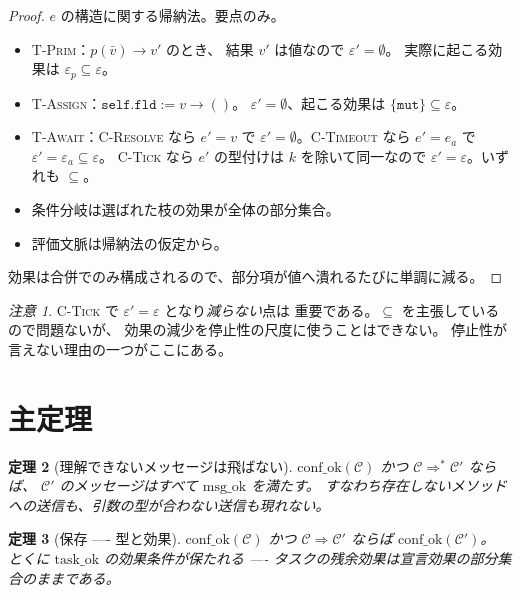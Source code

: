 \documentclass[11pt,a4paper]{ltjsarticle}
\newtheorem{theorem}{定理}
\theoremstyle{definition}
\theoremstyle{remark}
\newtheorem{remark}[theorem]{注意}
\newcommand{\msgok}{\mathrm{msg\_ok}}
\newcommand{\taskok}{\mathrm{task\_ok}}
\newcommand{\confok}{\mathrm{conf\_ok}}
\newcommand{\cstep}{\Longrightarrow}
\begin{document}
\begin{proof}
$e$ の構造に関する帰納法。要点のみ。
\begin{itemize}
\item \textsc{T-Prim}：$p(\bar v) \to v'$ のとき、
  結果 $v'$ は値なので $\varepsilon' = \emptyset$。
  実際に起こる効果は $\varepsilon_p \subseteq \varepsilon$。
\item \textsc{T-Assign}：$\mathtt{self}.\mathtt{fld} := v \to ()$。
  $\varepsilon' = \emptyset$、起こる効果は $\{\mathtt{mut}\} \subseteq \varepsilon$。
\item \textsc{T-Await}：\textsc{C-Resolve} なら $e' = v$ で
  $\varepsilon' = \emptyset$。\textsc{C-Timeout} なら $e' = e_a$ で
  $\varepsilon' = \varepsilon_a \subseteq \varepsilon$。
  \textsc{C-Tick} なら $e'$ の型付けは $k$ を除いて同一なので
  $\varepsilon' = \varepsilon$。いずれも $\subseteq$。
\item 条件分岐は選ばれた枝の効果が全体の部分集合。
\item 評価文脈は帰納法の仮定から。
\end{itemize}
効果は合併でのみ構成されるので、部分項が値へ潰れるたびに単調に減る。
\end{proof}

\begin{remark}
\textsc{C-Tick} で $\varepsilon' = \varepsilon$ となり\emph{減らない}点は
重要である。$\subseteq$ を主張しているので問題ないが、
効果の減少を停止性の尺度に使うことはできない。
停止性が言えない理由の一つがここにある。
\end{remark}

\section{主定理}

\begin{theorem}[理解できないメッセージは飛ばない]
\label{thm:nmnu}
$\confok(\mathcal{C})$ かつ $\mathcal{C} \cstep^{*} \mathcal{C}'$ ならば、
$\mathcal{C}'$ のメッセージはすべて $\msgok$ を満たす。
すなわち存在しないメソッドへの送信も、引数の型が合わない送信も現れない。
\end{theorem}

\begin{theorem}[保存 ---- 型と効果]
\label{thm:pres}
$\confok(\mathcal{C})$ かつ $\mathcal{C} \cstep \mathcal{C}'$ ならば
$\confok(\mathcal{C}')$。
とくに $\taskok$ の効果条件が保たれる ----
タスクの残余効果は宣言効果の部分集合のままである。
\end{theorem}
\end{document}

